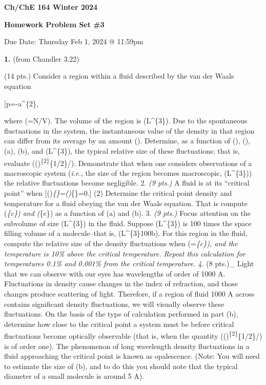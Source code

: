 \documentclass[
]{article}
\author{}
\date{}
\begin{document}
\textbf{Ch/ChE 164 Winter 2024}

\textbf{Homework Problem Set \#3}

Due Date: Thursday Feb 1, 2024 @ 11:59pm

\textbf{1.} (from Chandler 3.22)

(14 pts.) Consider a region within a fluid described by the van der
Waals equation

{[}\beta p=-\beta a\rho\^{}\{2\}, \tag{1}{]}

where (\rho=\langle N\rangle/V). The volume of the region is
(L\^{}\{3\}). Due to the spontaneous fluctuations in the system, the
instantaneous value of the density in that region can differ from its
average by an amount (\delta\rho). Determine, as a function of (\beta),
(\rho), (a), (b), and (L\^{}\{3\}), the typical relative size of these
fluctuations; that is, evaluate
(\langle(\delta\rho)\textsuperscript{\{2\}\rangle}\{1/2\}/\rho).
Demonstrate that when one considers observations of a macroscopic system
(\emph{i.e.}, the size of the region becomes macroscopic,
(L\^{}\{3\}\rightarrow\infty)) the relative fluctuations become
negligible. 2. \emph{(9 pts.)} A fluid is at its ``critical point'' when
{[}\left(\right)\emph{\{\beta\}=\left(\right)}\{\beta\}=0.{]}
(2) Determine the critical point density and temperature for a fluid
obeying the van der Waals equation. That is compute (\beta\emph{\{c\})
and (\rho}\{c\}) as a function of (a) and (b). 3. \emph{(9 pts.)} Focus
attention on the subvolume of size (L\^{}\{3\}) in the fluid. Suppose
(L\^{}\{3\}) is 100 times the space filling volume of a molecule--that
is, (L\^{}\{3\}\approx 100b). For this region in the fluid, compute the
relative size of the density fluctuations when (\rho=\rho\emph{\{c\}),
and the temperature is 10\% above the critical temperature. Repeat this
calculation for temperatures 0.1\% and 0.001\% from the critical
temperature. 4. }(8 pts.)\_ Light that we can observe with our eyes has
wavelengths of order of 1000 A. Fluctuations in density cause changes in
the index of refraction, and those changes produce scattering of light.
Therefore, if a region of fluid 1000 A across contains significant
density fluctuations, we will visually observe these fluctuations. On
the basis of the type of calculation performed in part (b), determine
how close to the critical point a system must be before critical
fluctuations become optically observable (that is, when the quantity
(\langle(\delta\rho)\textsuperscript{\{2\}\rangle}\{1/2\}/\rho) is of
order one). The phenomenon of long wavelength density fluctuations in a
fluid approaching the critical point is known as opalescence. (Note: You
will need to estimate the size of (b), and to do this you should note
that the typical diameter of a small molecule is around 5 A).
\end{document}
